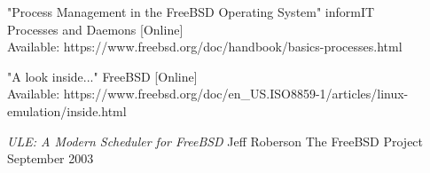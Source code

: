 \documentclass[letterpaper,10pt,notitlepage,fleqn]{article}
\begin{document}
\begin{thebibliography}{50}
    "Process Management in the FreeBSD Operating System" informIT \\

    Processes and Daemons [Online]\\ Available: 
    https://www.freebsd.org/doc/handbook/basics-processes.html

    "A look inside..." FreeBSD [Online]\\
        Available: https://www.freebsd.org/doc/en\_US.ISO8859-1/articles/linux-emulation/inside.html

    \textit{ULE: A Modern Scheduler for FreeBSD} Jeff Roberson The FreeBSD Project
    September 2003

\end{thebibliography}
\end{document}
